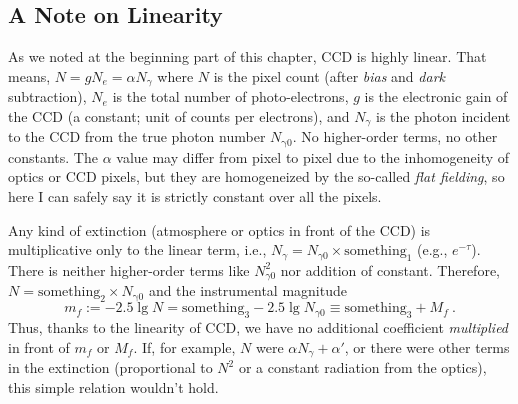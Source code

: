 \subsection{A Note on Linearity} \label{ss: linearity note}
As we noted at the beginning part of this chapter, CCD is highly linear. That means, $ N = g N_e = \alpha N_\gamma $ where $ N $ is the pixel count (after \emph{bias} and \emph{dark} subtraction), $ N_e $ is the total number of photo-electrons, $ g $ is the electronic gain of the CCD (a constant; unit of counts per electrons), and $ N_\gamma $ is the photon incident to the CCD from the true photon number $ N_\mathrm{\gamma 0} $. No higher-order terms, no other constants. The $ \alpha $ value may differ from pixel to pixel due to the inhomogeneity of optics or CCD pixels, but they are homogeneized by the so-called \emph{flat fielding}, so here I can safely say it is strictly constant over all the pixels. 

Any kind of extinction (atmosphere or optics in front of the CCD) is multiplicative only to the linear term, i.e., $ N_\gamma = N_{\gamma 0} \times \mathrm{something_1} $ (e.g., $ e^{-\tau} $). There is neither higher-order terms like $ N_{\gamma 0}^2 $ nor addition of constant. Therefore, $ N = \mathrm{something_2} \times N_\mathrm{\gamma 0} $ and the instrumental magnitude
\begin{equation}
  m_f 
    := -2.5 \lg N 
    = \mathrm{something_3} - 2.5 \lg N_{\gamma 0}
    \equiv \mathrm{something_3} + M_f ~.
\end{equation} 
Thus, thanks to the linearity of CCD, we have no additional coefficient \emph{multiplied} in front of $ m_f $ or $ M_f $. If, for example, $ N $ were $ \alpha N_\gamma + \alpha' $, or there were other terms in the extinction (proportional to $ N^2 $ or a constant radiation from the optics), this simple relation wouldn't hold.


